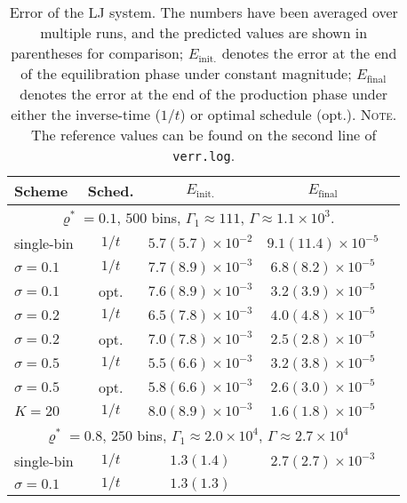 \documentclass[reprint, superscriptaddress, floatfix]{revtex4-1}
\newcommand{\note}[1]{{\color{DarkGreen}\footnotesize \textsc{Note.} #1}}
\newcommand{\Err}{E}
\begin{document}
\begin{table}[h]\footnotesize
  \caption{\label{tab:error_LJ}
    Error of the LJ system.
    The numbers have been averaged over multiple runs,
    and the predicted values are shown in parentheses for comparison;
    $\Err_\mathrm{init.}$
    denotes the error
    at the end of the equilibration phase under constant magnitude;
    $\Err_\mathrm{final}$
    denotes the error at the end of the production phase under
    either the inverse-time ($1/t$) or optimal schedule (opt.).
    \note{The reference values can be found
    on the second line of \texttt{verr.log}.}%
  }
  \setlength{\tabcolsep}{2pt}
  \renewcommand\arraystretch{1.4}
  \begin{tabular} { l c c c c }
    \hline
    Scheme & Sched. &
    $\Err_\mathrm{init.}$ &
    $\Err_\mathrm{final}$
    \\
    \hline
    \multicolumn{4}{c}{
      $\varrho^* = 0.1$,
      $500$ bins,
      $\Gamma_1 \approx 111$,
      $\Gamma \approx 1.1\times10^3$.
    } \\
    \hline
    single-bin & $1/t$
    & $5.7(5.7)\times10^{-2}$
    & $9.1(11.4)\times10^{-5}$
    \\
    $\sigma=0.1$ & $1/t$
    & $7.7(8.9)\times10^{-3}$
    & $6.8(8.2)\times10^{-5}$
    \\
    $\sigma=0.1$ & opt.
    & $7.6(8.9)\times10^{-3}$
    & $3.2(3.9)\times10^{-5}$
    \\
    $\sigma=0.2$ & $1/t$
    & $6.5(7.8)\times10^{-3}$
    & $4.0(4.8)\times10^{-5}$
    \\
    $\sigma=0.2$ & opt.
    & $7.0(7.8)\times10^{-3}$
    & $2.5(2.8)\times10^{-5}$
    \\
    $\sigma=0.5$ & $1/t$
    & $5.5(6.6)\times10^{-3}$
    & $3.2(3.8)\times10^{-5}$
    \\
    $\sigma=0.5$ & opt.
    & $5.8(6.6)\times10^{-3}$
    & $2.6(3.0)\times10^{-5}$
    \\
    $K=20$ & $1/t$
    & $8.0(8.9)\times10^{-3}$
    & $1.6(1.8)\times10^{-5}$
    \\
    \hline
    \multicolumn{4}{c}{
      $\varrho^* = 0.8$,
      $250$ bins,
      $\Gamma_1 \approx 2.0\times10^4$,
      $\Gamma \approx 2.7\times10^4$
    } \\
    \hline
    single-bin & $1/t$
    & $1.3(1.4)$
    & $2.7(2.7)\times10^{-3}$
    \\
    $\sigma=0.1$ & $1/t$
    & $1.3(1.3)$

\end{tabular}
\end{table}
\end{document}
